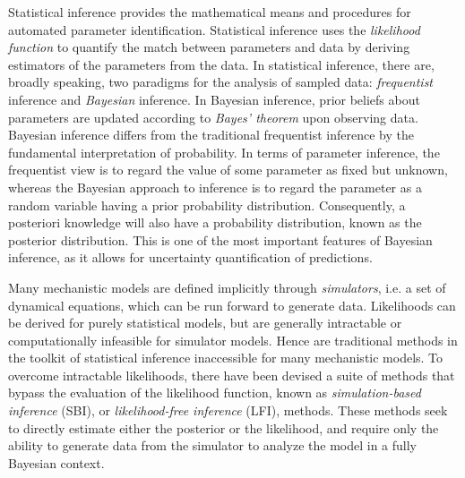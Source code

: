 Statistical inference provides the mathematical means and procedures for automated parameter identification. Statistical inference uses the \textit{likelihood function} to quantify the match between parameters and data by deriving estimators of the parameters from the data. In statistical inference, there are, broadly speaking, two paradigms for the analysis of sampled data: \textit{frequentist} inference and \textit{Bayesian} inference. In Bayesian inference, prior beliefs about parameters are updated according to \textit{Bayes' theorem} upon observing data. Bayesian inference differs from the traditional frequentist inference by the fundamental interpretation of probability. In terms of parameter inference, the frequentist view is to regard the value of some parameter as fixed but unknown, whereas the Bayesian approach to inference is to regard the parameter as a random variable having a prior probability distribution. Consequently, a posteriori knowledge will also have a probability distribution, known as the posterior distribution. This is one of the most important features of Bayesian inference, as it allows for uncertainty quantification of predictions. %

Many mechanistic models are defined implicitly through \textit{simulators}, i.e. a set of dynamical equations, which can be run forward to generate data. Likelihoods can be derived for purely statistical models, but are generally intractable or computationally infeasible for simulator models. Hence are traditional methods in the toolkit of statistical inference inaccessible for many mechanistic models. To overcome intractable likelihoods, there have been devised a suite of methods that bypass the evaluation of the likelihood function, known as \textit{simulation-based inference} (SBI), or \textit{likelihood-free inference} (LFI), methods. These methods seek to directly estimate either the posterior or the likelihood, and require only the ability to generate data from the simulator to analyze the model in a fully Bayesian context. 

